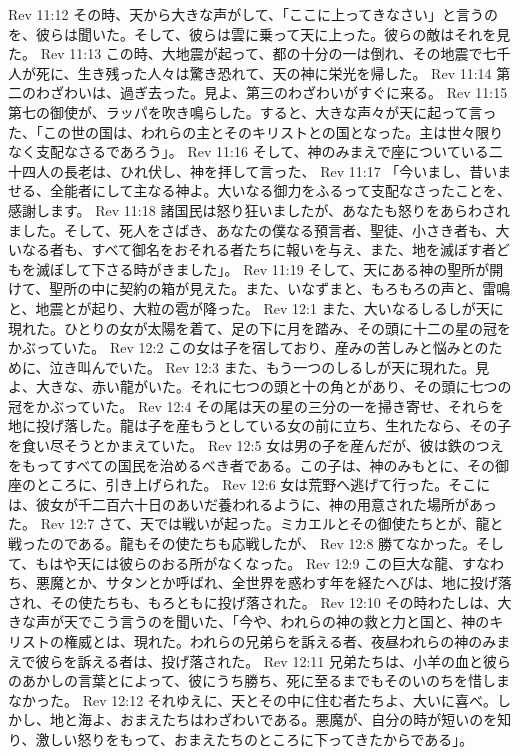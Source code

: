 Rev 11:12  その時、天から大きな声がして、「ここに上ってきなさい」と言うのを、彼らは聞いた。そして、彼らは雲に乗って天に上った。彼らの敵はそれを見た。
Rev 11:13  この時、大地震が起って、都の十分の一は倒れ、その地震で七千人が死に、生き残った人々は驚き恐れて、天の神に栄光を帰した。
Rev 11:14  第二のわざわいは、過ぎ去った。見よ、第三のわざわいがすぐに来る。
Rev 11:15  第七の御使が、ラッパを吹き鳴らした。すると、大きな声々が天に起って言った、「この世の国は、われらの主とそのキリストとの国となった。主は世々限りなく支配なさるであろう」。
Rev 11:16  そして、神のみまえで座についている二十四人の長老は、ひれ伏し、神を拝して言った、
Rev 11:17  「今いまし、昔いませる、全能者にして主なる神よ。大いなる御力をふるって支配なさったことを、感謝します。
Rev 11:18  諸国民は怒り狂いましたが、あなたも怒りをあらわされました。そして、死人をさばき、あなたの僕なる預言者、聖徒、小さき者も、大いなる者も、すべて御名をおそれる者たちに報いを与え、また、地を滅ぼす者どもを滅ぼして下さる時がきました」。
Rev 11:19  そして、天にある神の聖所が開けて、聖所の中に契約の箱が見えた。また、いなずまと、もろもろの声と、雷鳴と、地震とが起り、大粒の雹が降った。
Rev 12:1  また、大いなるしるしが天に現れた。ひとりの女が太陽を着て、足の下に月を踏み、その頭に十二の星の冠をかぶっていた。
Rev 12:2  この女は子を宿しており、産みの苦しみと悩みとのために、泣き叫んでいた。
Rev 12:3  また、もう一つのしるしが天に現れた。見よ、大きな、赤い龍がいた。それに七つの頭と十の角とがあり、その頭に七つの冠をかぶっていた。
Rev 12:4  その尾は天の星の三分の一を掃き寄せ、それらを地に投げ落した。龍は子を産もうとしている女の前に立ち、生れたなら、その子を食い尽そうとかまえていた。
Rev 12:5  女は男の子を産んだが、彼は鉄のつえをもってすべての国民を治めるべき者である。この子は、神のみもとに、その御座のところに、引き上げられた。
Rev 12:6  女は荒野へ逃げて行った。そこには、彼女が千二百六十日のあいだ養われるように、神の用意された場所があった。
Rev 12:7  さて、天では戦いが起った。ミカエルとその御使たちとが、龍と戦ったのである。龍もその使たちも応戦したが、
Rev 12:8  勝てなかった。そして、もはや天には彼らのおる所がなくなった。
Rev 12:9  この巨大な龍、すなわち、悪魔とか、サタンとか呼ばれ、全世界を惑わす年を経たへびは、地に投げ落され、その使たちも、もろともに投げ落された。
Rev 12:10  その時わたしは、大きな声が天でこう言うのを聞いた、「今や、われらの神の救と力と国と、神のキリストの権威とは、現れた。われらの兄弟らを訴える者、夜昼われらの神のみまえで彼らを訴える者は、投げ落された。
Rev 12:11  兄弟たちは、小羊の血と彼らのあかしの言葉とによって、彼にうち勝ち、死に至るまでもそのいのちを惜しまなかった。
Rev 12:12  それゆえに、天とその中に住む者たちよ、大いに喜べ。しかし、地と海よ、おまえたちはわざわいである。悪魔が、自分の時が短いのを知り、激しい怒りをもって、おまえたちのところに下ってきたからである」。
